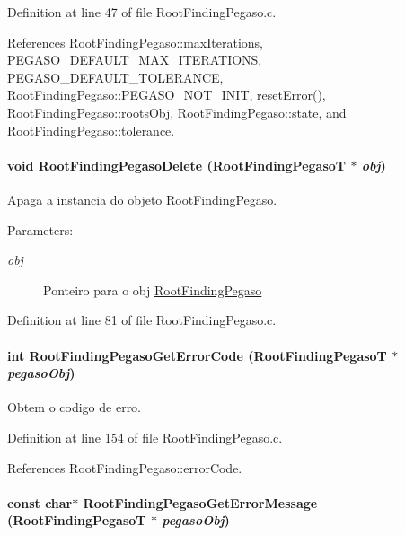 Definition at line 47 of file RootFindingPegaso.c.

References RootFindingPegaso::maxIterations, PEGASO\_\-DEFAULT\_\-MAX\_\-ITERATIONS, PEGASO\_\-DEFAULT\_\-TOLERANCE, RootFindingPegaso::PEGASO\_\-NOT\_\-INIT, resetError(), RootFindingPegaso::rootsObj, RootFindingPegaso::state, and RootFindingPegaso::tolerance.\hypertarget{group____pegaso_gea8cce31a68dcb1d7b2aa3e48d114366}{
\paragraph[RootFindingPegasoDelete]{\setlength{\rightskip}{0pt plus 5cm}void RootFindingPegasoDelete ({\bf RootFindingPegasoT} $\ast$ {\em obj})}\hfill}
\label{group____pegaso_gea8cce31a68dcb1d7b2aa3e48d114366}


Apaga a instancia do objeto \hyperlink{structRootFindingPegaso}{RootFindingPegaso}. 

\begin{Desc}
\item[Parameters:]
\begin{description}
\item[{\em obj}]Ponteiro para o obj \hyperlink{structRootFindingPegaso}{RootFindingPegaso} \end{description}
\end{Desc}


Definition at line 81 of file RootFindingPegaso.c.\hypertarget{group____pegaso_g6b27d39dab4f225185c07eb6fbb22ff9}{
\paragraph[RootFindingPegasoGetErrorCode]{\setlength{\rightskip}{0pt plus 5cm}int RootFindingPegasoGetErrorCode ({\bf RootFindingPegasoT} $\ast$ {\em pegasoObj})}\hfill}
\label{group____pegaso_g6b27d39dab4f225185c07eb6fbb22ff9}


Obtem o codigo de erro. 



Definition at line 154 of file RootFindingPegaso.c.

References RootFindingPegaso::errorCode.\hypertarget{group____pegaso_g4d0abd516b71e0462de1b22ce896b87a}{
\paragraph[RootFindingPegasoGetErrorMessage]{\setlength{\rightskip}{0pt plus 5cm}const char$\ast$ RootFindingPegasoGetErrorMessage ({\bf RootFindingPegasoT} $\ast$ {\em pegasoObj})}\hfill}
\label{group____pegaso_g4d0abd516b71e0462de1b22ce896b87a}


